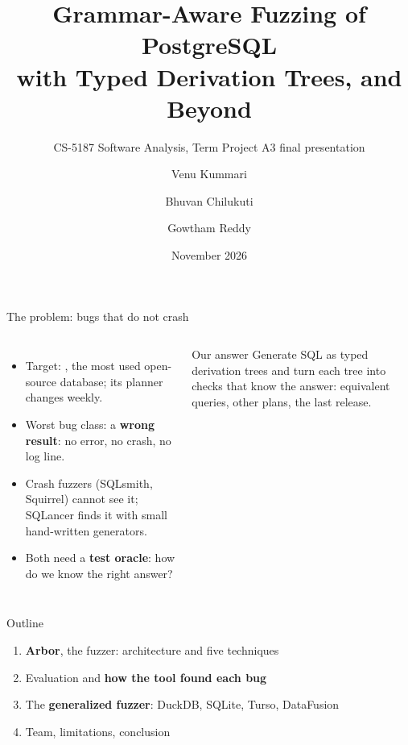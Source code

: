 \documentclass[aspectratio=169,10pt]{beamer}
\title{Grammar-Aware Fuzzing of PostgreSQL\\with Typed Derivation Trees, and Beyond}
\subtitle{CS-5187 Software Analysis, Term Project A3 \quad final presentation}
\author{Venu Kummari \and Bhuvan Chilukuti \and Gowtham Reddy}
\institute{IIT Guwahati}
\date{November 2026}
\begin{document}
\maketitle
{}

\begin{frame}{The problem: bugs that do not crash}
\begin{columns}[T]
\begin{itemize}
  \item Target: \textbf{\pg}, the most used open-source database; its planner changes weekly.
  \item Worst bug class: a \textbf{wrong result}: no error, no crash, no log line.
  \item Crash fuzzers (SQLsmith, Squirrel) cannot see it; SQLancer finds it with small hand-written generators.
  \item Both need a \textbf{test oracle}: how do we know the right answer?
\end{itemize}
\begin{block}{Our answer}
Generate SQL as \alert{typed derivation trees} and turn each tree into
\alert{checks that know the answer}: equivalent queries, other plans, the last release.
\end{block}
\end{columns}
\end{frame}

\begin{frame}{Outline}
\begin{enumerate}
  \item \textbf{Arbor}, the \pg fuzzer: architecture and five techniques
  \item Evaluation and \textbf{how the tool found each bug}
  \item The \textbf{generalized fuzzer}: DuckDB, SQLite, Turso, DataFusion
  \item Team, limitations, conclusion
\end{enumerate}
\end{frame}
\end{document}
